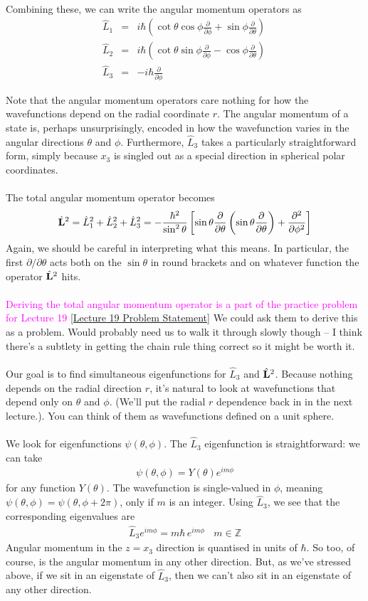 \documentclass[12pt]{article}
\def\be{\begin{eqnarray}}
\def\ee{\end{eqnarray}}
\newcommand{\nn}{\nonumber}
\newcommand\para{\paragraph{}}
\newcommand{\ppp}[2]{\frac{\partial {#1}}{\partial {#2}}}
\newcommand{\co}{\color{olive}}
\newcommand{\cblue}{\color{blue}}
\newcommand{\Z}{{\mathds Z}}
\newcommand{\alyssa}{\textcolor{magenta}}
\begin{document}
{{\para
Combining these, we can write the angular momentum operators as
%
\be \hat{L}_1 &=& i\hbar\left(\cot\theta\cos\phi \ppp{}{\phi} + \sin\phi\ppp{}{\theta}\right)\ \nn\\
\hat{L}_2 &=& i\hbar\left(\cot\theta\sin\phi \ppp{}{\phi} - \cos\phi \ppp{}{\theta}\right)\ \nn\\
\hat{L}_3 &=& -i\hbar \ppp{}{\phi}\nn\ee
%
}
Note that the angular momentum operators care nothing for how the wavefunctions depend on the radial coordinate $r$. The angular momentum of a state is, perhaps unsurprisingly, encoded in how the wavefunction varies in the angular directions  $\theta$ and $\phi$. Furthermore, $\hat{L}_3$ takes a  particularly straightforward form, simply because $x_3$ is singled out as a special direction in spherical polar coordinates.


\para
{\co The total angular momentum operator becomes
%
\be \hat{\bf L}^2 = \hat{L}_1^2+\hat{L}_2^2 + \hat{L}_3^2 = -\frac{\hbar^2}{\sin^2\theta} \left[\sin\theta\ppp{}{\theta}\left(\sin\theta\ppp{}{\theta}\right) + \ppp{^2}{\phi^2}\right]\nn\ee
%
}
Again, we should be careful in interpreting what this means. In particular, the first $\partial/\partial\theta$ acts both on the $\sin\theta$ in round brackets and  on whatever function the operator $\hat{\bf L}^2$ hits. 

\para
\alyssa{Deriving the total angular momentum operator is a part of the practice problem for Lecture 19} \href{https://drive.google.com/file/d/1rzUg-9TFLG4pKcETaEh5WDlRMdxFGVMX/view?usp=drive_link}{[Lecture 19 Problem Statement]}
{\cblue We could ask them to derive this as a problem. Would probably need us to walk it through slowly though -- I think there's a subtlety in getting the chain rule thing correct so it might be worth it.}

\para
Our goal is to find simultaneous eigenfunctions for $\hat{L}_3$ and $\hat{\bf L}^2$. Because nothing depends on the radial direction $r$, it's natural to look at  wavefunctions that depend only on $\theta$ and $\phi$. (We'll put the radial $r$ dependence back in in the next lecture.). You can think of them as wavefunctions defined on a unit sphere.

\para
{\co We look for eigenfunctions $\psi(\theta,\phi)$. 
 The $\hat{L}_3$ eigenfunction is straightforward: we can take 
%
\be \psi(\theta,\phi) = Y(\theta) e^{im\phi}\nn\ee
%
for any function $Y(\theta)$. The wavefunction is single-valued in $\phi$, meaning $\psi(\theta,\phi) = \psi(\theta,\phi+2\pi)$, only if $m$ is an integer. Using $\hat{L}_3$, we see that the corresponding eigenvalues are
%
\be \hat{L}_3 e^{im\phi} = m\hbar\,e^{im\phi}\ \ \ \ m\in \Z\nn\ee
%
Angular momentum in the $z=x_3$ direction is quantised in units of $\hbar$.} So too, of course, is the angular momentum in any other direction. But, as we've stressed above, if we sit in an eigenstate of $\hat{L}_3$, then we can't also sit in an eigenstate of any other direction. 

}
\end{document}
